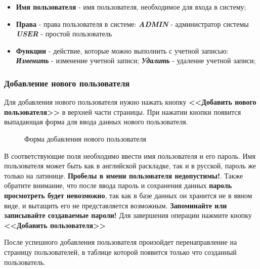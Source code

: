 \documentclass[a4paper]{article}
\begin{document}
\begin{itemize}
\setlength{\itemsep}{-2mm}
	\item \textbf{Имя пользователя} - имя пользователя, необходимое для входа в систему;
	\item \textbf{Права} - права пользователя в системе:
		\subitem \textbf{\textit{ADMIN}} -  администратор системы
		\subitem \textbf{\textit{USER}} - простой пользователь
	\item \textbf{Функции} -  действие, которые можно выполнить с учетной записью:
		\subitem \textbf{\textit{Изменить}} - изменение учетной записи;
		\subitem \textbf{\textit{Удалить}} - удаление учетной записи;
\end{itemize}

\subsubsection{Добавление нового пользователя}

Для добавления нового пользователя нужно нажать кнопку \textbf{<<Добавить нового пользователя>>} в верхней части страницы. При нажатии кнопки появится выпадающая форма для ввода данных нового пользователя.

\begin{figure}[h]
\caption{Форма добавления нового пользователя}
\label{fig:image9}
\end{figure}

В соответствующие поля необходимо ввести имя пользователя и его пароль. Имя пользователя может быть как в английской раскладке, так и в русской, пароль же только на латинице. \textbf{Пробелы в имени пользователя недопустимы!}. Также обратите внимание, что после ввода пароль и сохранения данных \textbf{пароль просмотреть будет невозможно}, так как в базе данных он хранится не в явном виде, и вытащить его не представляется возможным. \textbf{Запоминайте или записывайте создаваемые пароли!} Для завершения операции нажмите кнопку \textbf{<<Добавить пользователя>>}

После успешного добавления пользователя произойдет перенаправление на страницу пользователей, в таблице которой появится только что созданный пользователь.
\end{document}
